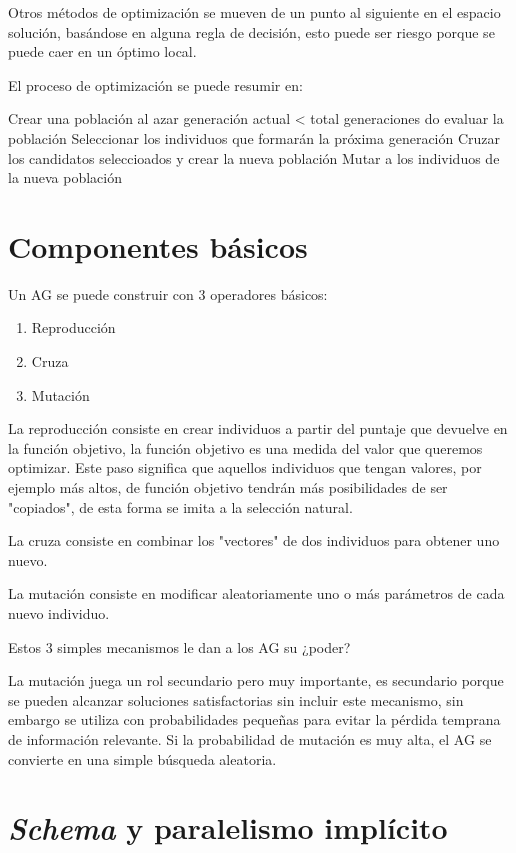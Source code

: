 
Otros métodos de optimización se mueven de un punto al siguiente en el espacio
solución, basándose en alguna regla de decisión, esto puede ser riesgo porque
se puede caer en un óptimo local.

El proceso de optimización se puede resumir en:

Crear una población al azar
generación actual < total generaciones do
evaluar la población
Seleccionar los individuos que formarán la próxima generación
Cruzar los candidatos seleccioados y crear la nueva población
Mutar a los individuos de la nueva población


\section{Componentes básicos}
%
Un AG se puede construir con 3 operadores básicos:
\begin{enumerate}
    \item Reproducción
    \item Cruza
    \item Mutación
\end{enumerate}

La reproducción consiste en crear individuos a partir del puntaje que devuelve
en la función objetivo, la función objetivo es una medida del valor que
queremos optimizar.
%
Este paso significa que aquellos individuos que tengan valores, por ejemplo más
altos, de función objetivo tendrán más posibilidades de ser "copiados", de esta
forma se imita a la selección natural.

La cruza consiste en combinar los "vectores" de dos individuos para obtener uno
nuevo.

La mutación consiste en modificar aleatoriamente uno o más parámetros de cada
nuevo individuo.

Estos 3 simples mecanismos le dan a los AG su ¿poder?

La mutación juega un rol secundario pero muy importante, es secundario porque
se pueden alcanzar soluciones satisfactorias sin incluir este mecanismo, sin
embargo se utiliza con probabilidades pequeñas para evitar la pérdida temprana
de información relevante.
%
Si la probabilidad de mutación es muy alta, el AG se convierte en una simple
búsqueda aleatoria.

\section{\emph{Schema} y paralelismo implícito}

